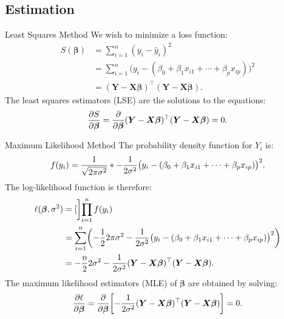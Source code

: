 \documentclass{article}\usepackage[]{graphicx}\usepackage[svgnames]{xcolor}
\newcommand*\circled[1]{\tikz[baseline=(char.base)]{\node[shape=circle,draw,inner sep=2pt] (char) {#1};}}
\let\exp\relax%
\let\log\relax%
\providecommand{\RandomVector}[1]{\bm{#1}}%
\providecommand{\Vector}[1]{\bm{#1}}%
\providecommand{\Matrix}[1]{\bm{#1}}
\begin{document}
\subsection*{\circled{2} Estimation}
\begin{Regular}{Least Squares Method}
      We wish to minimize a loss function:
      \begin{align*}
            S(\Vector{\beta})
             & =\sum_{i=1}^{n} (y_i-\hat{y}_i)^2                                                             \\
             & =\sum_{i=1}^{n} \bigl(y_i-(\beta_0+\beta_1x_{i1}+\cdots+\beta_p x_{ip})\bigr)^2               \\
             & =(\RandomVector{Y}-\Matrix{X}\Vector{\beta})^\top(\RandomVector{Y}-\Matrix{X}\Vector{\beta}).
      \end{align*}
      The least squares estimators (LSE) are the solutions to the equations:
      \[ \pdv{S}{\Vector{\beta}}=\pdv*{(\RandomVector{Y}-\Matrix{X}\Vector{\beta})^\top(\RandomVector{Y}-\Matrix{X}\Vector{\beta})}{\Vector{\beta}}=0. \]
\end{Regular}
\begin{Regular}{Maximum Likelihood Method}
      The probability density function for $ Y_i $ is:
      \[ f(y_i)=\frac{1}{\sqrt{2\mathrm{\pi}\sigma^2}}\exp*{-\frac{1}{2\sigma^2}\bigl(y_i-(\beta_0+\beta_1x_{i1}+\cdots+\beta_p x_{ip})\bigr)^2 }.  \]
      The log-likelihood function is therefore:
      \begin{align*}
            \ell(\Vector{\beta},\sigma^2)
             & =\log[\bigg]{\prod_{i=1}^n f(y_i)}                                                                                                                         \\
             & =\sum_{i=1}^{n} \biggl(-\frac{1}{2} \log{2\mathrm{\pi}\sigma^2}-\frac{1}{2\sigma^2}\bigl(y_i-(\beta_0+\beta_1x_{i1}+\cdots+\beta_p x_{ip})\bigr)^2 \biggr) \\
             & =-\frac{n}{2} \log{2\sigma^2}-\frac{1}{2\sigma^2} (\RandomVector{Y}-\Matrix{X}\Vector{\beta})^\top(\RandomVector{Y}-\Matrix{X}\Vector{\beta}).
      \end{align*}
      The maximum likelihood estimators (MLE) of $ \Vector{\beta} $ are obtained by solving:
      \[ \pdv{\ell}{\Vector{\beta}}=\pdv*{\biggl[-\frac{1}{2\sigma^2}(\RandomVector{Y}-\Matrix{X}\Vector{\beta})^\top(\RandomVector{Y}-\Matrix{X}\Vector{\beta})\biggr]}{\Vector{\beta}}=0. \]
\end{Regular}
\end{document}
